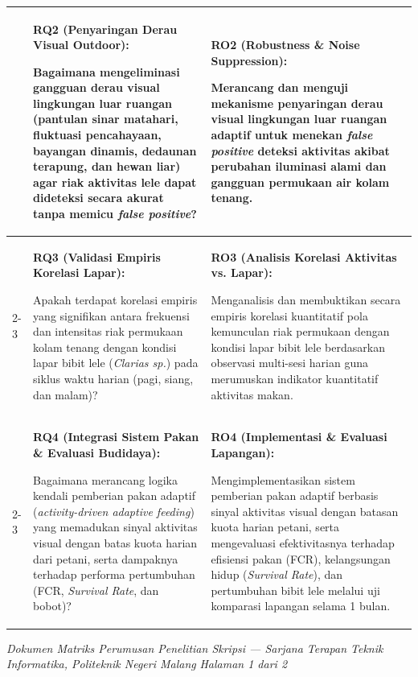 \documentclass[10pt,a4paper]{article}
\begin{document}
\begin{table}[h!]
\begin{tabular}{|p{8.2cm}|p{8.8cm}|p{8.8cm}|}
& \textbf{RQ2 (Penyaringan Derau Visual Outdoor):}\par
Bagaimana mengeliminasi gangguan derau visual lingkungan luar ruangan (pantulan sinar matahari, fluktuasi pencahayaan, bayangan dinamis, dedaunan terapung, dan hewan liar) agar riak aktivitas lele dapat dideteksi secara akurat tanpa memicu \textit{false positive}?
& \textbf{RO2 (Robustness \& Noise Suppression):}\par
Merancang dan menguji mekanisme penyaringan derau visual lingkungan luar ruangan adaptif untuk menekan \textit{false positive} deteksi aktivitas akibat perubahan iluminasi alami dan gangguan permukaan air kolam tenang.\\[10pt] \cline{2-3}

& \textbf{RQ3 (Validasi Empiris Korelasi Lapar):}\par
Apakah terdapat korelasi empiris yang signifikan antara frekuensi dan intensitas riak permukaan kolam tenang dengan kondisi lapar bibit lele (\textit{Clarias sp.}) pada siklus waktu harian (pagi, siang, dan malam)?
& \textbf{RO3 (Analisis Korelasi Aktivitas vs. Lapar):}\par
Menganalisis dan membuktikan secara empiris korelasi kuantitatif pola kemunculan riak permukaan dengan kondisi lapar bibit lele berdasarkan observasi multi-sesi harian guna merumuskan indikator kuantitatif aktivitas makan.\\[10pt] \cline{2-3}

& \textbf{RQ4 (Integrasi Sistem Pakan \& Evaluasi Budidaya):}\par
Bagaimana merancang logika kendali pemberian pakan adaptif (\textit{activity-driven adaptive feeding}) yang memadukan sinyal aktivitas visual dengan batas kuota harian dari petani, serta dampaknya terhadap performa pertumbuhan (FCR, \textit{Survival Rate}, dan bobot)?
& \textbf{RO4 (Implementasi \& Evaluasi Lapangan):}\par
Mengimplementasikan sistem pemberian pakan adaptif berbasis sinyal aktivitas visual dengan batasan kuota harian petani, serta mengevaluasi efektivitasnya terhadap efisiensi pakan (FCR), kelangsungan hidup (\textit{Survival Rate}), dan pertumbuhan bibit lele melalui uji komparasi lapangan selama 1 bulan.\\[10pt] \hline
\end{tabular}
\end{table}

\vfill
\begin{center}
    \scriptsize \textit{Dokumen Matriks Perumusan Penelitian Skripsi --- Sarjana Terapan Teknik Informatika, Politeknik Negeri Malang} \hfill \textit{Halaman 1 dari 2}
\end{center}
\end{document}
